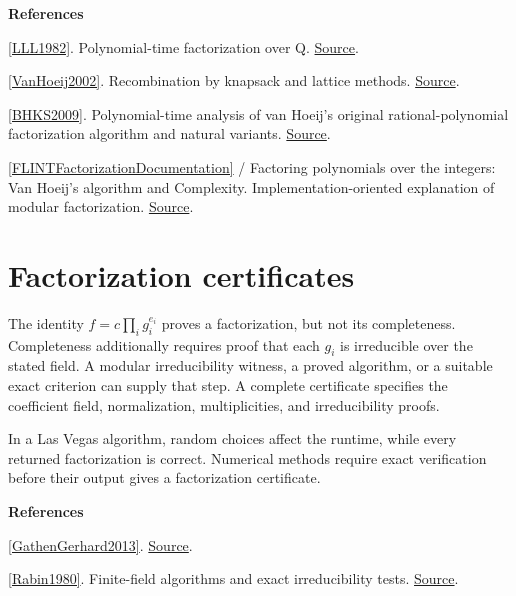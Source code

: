 \documentclass[11pt,a4paper,oneside,openany]{book}
\newenvironment{sources}{\par\smallskip\begingroup\footnotesize\color{atlasgray}\leftskip=10pt\setlength{\parskip}{2pt}}{\par\endgroup\smallskip}
\begin{document}
\begin{sources}
\textbf{References}\par\smallskip
\noindent\hyperlink{ref:LLL1982}{[LLL1982]}. Polynomial-time factorization over Q. \href{https://doi.org/10.1007/BF01457454}{Source}.\par
\noindent\hyperlink{ref:VanHoeij2002}{[VanHoeij2002]}. Recombination by knapsack and lattice methods. \href{https://doi.org/10.1006/jnth.2001.2763}{Source}.\par
\noindent\hyperlink{ref:BHKS2009}{[BHKS2009]}. Polynomial-time analysis of van Hoeij's original rational-polynomial factorization algorithm and natural variants. \href{https://www.numdam.org/articles/10.5802/jtnb.655/}{Source}.\par
\noindent\hyperlink{ref:FLINTFactorizationDocumentation}{[FLINTFactorizationDocumentation]} / Factoring polynomials over the integers: Van Hoeij's algorithm and Complexity. Implementation-oriented explanation of modular factorization. \href{https://flintlib.org/doc/algorithms/polynomials/factoring-finite-fields.html}{Source}.\par
\end{sources}\color{black}
\section{Factorization certificates}
\color{black} The identity \(f=c\prod_i g_i^{e_i}\) proves a factorization, but not its completeness. Completeness additionally requires proof that each \(g_i\) is irreducible over the stated field. A modular irreducibility witness, a proved algorithm, or a suitable exact criterion can supply that step. A complete certificate specifies the coefficient field, normalization, multiplicities, and irreducibility proofs.\par
\color{black} In a Las Vegas algorithm, random choices affect the runtime, while every returned factorization is correct. Numerical methods require exact verification before their output gives a factorization certificate.\par
\begin{sources}
\textbf{References}\par\smallskip
\noindent\hyperlink{ref:GathenGerhard2013}{[GathenGerhard2013]}.  \href{https://doi.org/10.1017/CBO9781139856065}{Source}.\par
\noindent\hyperlink{ref:Rabin1980}{[Rabin1980]}. Finite-field algorithms and exact irreducibility tests. \href{https://doi.org/10.1137/0209024}{Source}.\par
\end{sources}\color{black}
\end{document}
